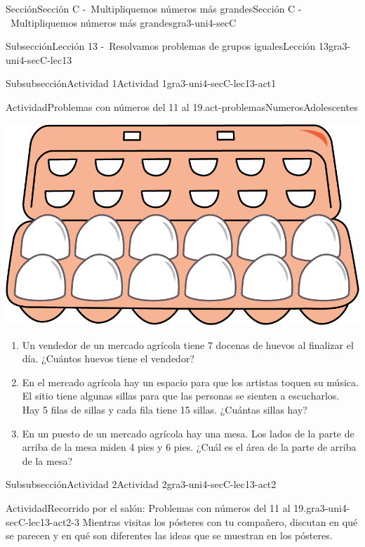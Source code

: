 \documentclass[twoside,10pt,]{article}
\begin{document}
\begin{sectionptx}{Sección}{Sección C -~Multipliquemos números más grandes}{}{Sección C -~Multipliquemos números más grandes}{}{}{gra3-uni4-secC}
\begin{subsectionptx}{Subsección}{Lección 13 -~Resolvamos problemas de grupos iguales}{}{Lección 13}{}{}{gra3-uni4-secC-lec13}
\begin{subsubsectionptx}{Subsubsección}{Actividad 1}{}{Actividad 1}{}{}{gra3-uni4-secC-lec13-act1}
\begin{activity}{Actividad}{Problemas con números del 11 al 19.}{act-problemasNumerosAdolescentes}
\begin{sidebyside}{2}{0.05}{0.05}{0.1}
\begin{sbspanel}{0.3}%
\includegraphics[width=\linewidth]{external/png-source/egg_carton.png}
\end{sbspanel}%
\end{sidebyside}%
%
\begin{enumerate}
\item{}Un vendedor de un mercado agrícola tiene 7 docenas de huevos al finalizar el día. ¿Cuántos huevos tiene el vendedor?%
\item{}En el mercado agrícola hay un espacio para que los artistas toquen su música. El sitio tiene algunas sillas para que las personas se sienten a escucharlos. Hay 5 filas de sillas y cada fila tiene 15 sillas. ¿Cuántas sillas hay?%
\item{}En un puesto de un mercado agrícola hay una mesa. Los lados de la parte de arriba de la mesa miden 4 pies y 6 pies. ¿Cuál es el área de la parte de arriba de la mesa?%
\end{enumerate}
\end{activity}%
\end{subsubsectionptx}
%
%
\typeout{************************************************}
\typeout{************************************************}
%
\begin{subsubsectionptx}{Subsubsección}{Actividad 2}{}{Actividad 2}{}{}{gra3-uni4-secC-lec13-act2}
\begin{activity}{Actividad}{Recorrido por el salón: Problemas con números del 11 al 19.}{gra3-uni4-secC-lec13-act2-3}%
Mientras visitas los pósteres con tu compañero, discutan en qué se parecen y en qué son diferentes las ideas que se muestran en los pósteres.%
\end{activity}%
\end{subsubsectionptx}
%
%
\typeout{************************************************}

\end{subsectionptx}
\end{sectionptx}
\end{document}
